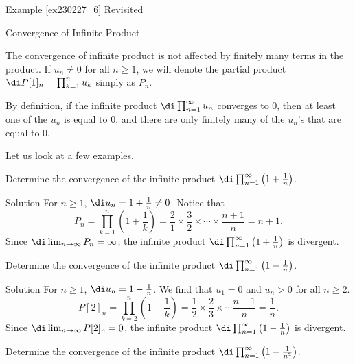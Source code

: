 \begin{example}{\linkt Example \ref{ex230227_6} Revisited}
\begin{example}[label=ex230227_13]{}
\begin{definition}{Convergence of Infinite Product}
\begin{enumerate}[(a)]
\begin{enumerate}[(i)]
\end{enumerate}
\end{enumerate}
\end{definition}
The convergence of infinite product is not affected by finitely many terms in the product. If $u_n\neq 0$ for all $n\geq 1$, we will denote the partial product $\di P[1]_n=\prod_{k=1}^n u_k$ simply as $P_n$. 

\begin{highlight}{} 
By definition, if the infinite product $\di\prod_{n=1}^{\infty}u_n$ converges to 0, then at least one of the $u_n$ is equal to 0, and  there are only finitely many of the $u_n$'s that are equal to 0.
\end{highlight}
Let us look at a few examples.


\begin{example}[label=ex230301_1]{}
Determine the convergence of the infinite product $\di\prod_{n=1}^{\infty}\left(1+\frac{1}{n}\right)$.
\end{example}
\begin{solution}{Solution}
For $n\geq 1$, $\di u_n=1+\frac{1}{n}\neq 0$. Notice that
\[P_n=\prod_{k=1}^n\left(1+\frac{1}{k}\right)=\frac{2}{1}\times\frac{3}{2}\times\cdots\times\frac{n+1}{n}=n+1.\]
Since $\di\lim_{n\to\infty}P_n=\infty$, the infinite product $\di\prod_{n=1}^{\infty}\left(1+\frac{1}{n}\right)$ is divergent.

\end{solution}

\begin{example}[label=ex230301_2]{}
Determine the convergence of the infinite product $\di\prod_{n=1}^{\infty}\left(1-\frac{1}{n}\right)$.
\end{example}
\begin{solution}{Solution}
 For $n\geq 1$, $\di u_n=1-\frac{1}{n}$. We find that $u_1=0$ and $u_n>0$ for all $n\geq 2$.
\[P[2]_n=\prod_{k=2}^n\left(1-\frac{1}{k}\right)=\frac{1}{2}\times\frac{2}{3}\times\cdots\frac{n-1}{n}=\frac{1}{n}.\]
Since $\di\lim_{n\to\infty}P[2]_n=0$, the infinite product $\di\prod_{n=1}^{\infty}\left(1-\frac{1}{n}\right)$ is divergent.
\end{solution}

\begin{example}[label=ex230301_3]{}
Determine the convergence of the infinite product $\di\prod_{n=1}^{\infty}\left(1-\frac{1}{n^2}\right)$.
\end{example}
 

\end{example}
\end{example}
